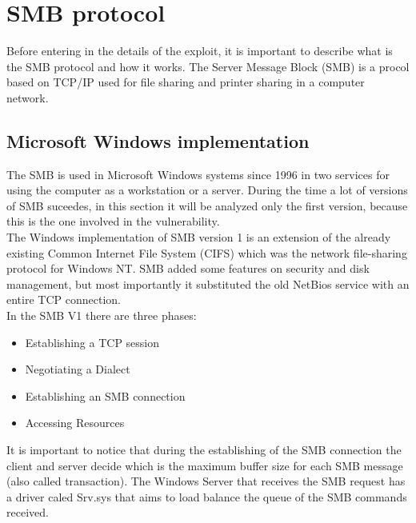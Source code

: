 \section{SMB protocol}
Before entering in the details of the exploit, it is important to describe what is the SMB 
protocol and how it works.
The Server Message Block (SMB) is a procol based on TCP/IP used for file sharing and printer sharing 
in a computer network.

\subsection{Microsoft Windows implementation}
The SMB is used in Microsoft Windows systems since 1996 in two services for using the computer as a 
workstation or a server.
During the time a lot of versions of SMB suceedes, in this section it will be analyzed only the first version, because
this is the one involved in the vulnerability.\\
The Windows implementation of SMB version 1 is an extension of the already existing Common Internet File System (CIFS)
which was the network file-sharing protocol for Windows NT.
SMB added some features on security and disk management, but most importantly it substituted the old NetBios service with an entire 
TCP connection.\\
In the SMB V1 there are three phases:
\begin{itemize}
    \item Establishing a TCP session
    \item Negotiating a Dialect
    \item Establishing an SMB connection
    \item Accessing Resources
\end{itemize}
It is important to notice that during the establishing of the SMB connection the client and server decide which is the maximum
buffer size for each SMB message (also called transaction).
The Windows Server that receives the SMB request has a driver caled Srv.sys that aims to load balance the queue of the SMB commands received.

